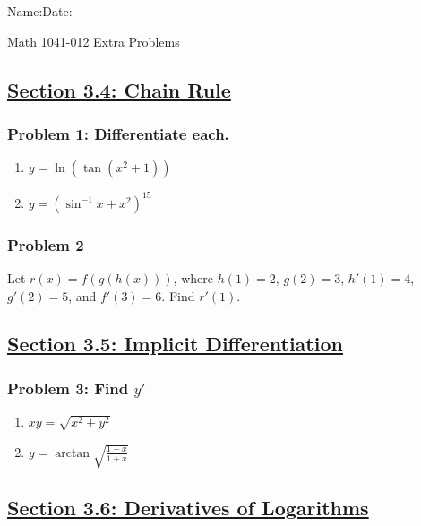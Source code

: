 \documentclass[10pt]{book}
\theoremstyle{definition}
\begin{document}
\begin{flushleft}
Name:\underline{\hspace{13cm}}Date:\underline{\hspace{2cm}}
\end{flushleft}
\begin{center}
{\Large Math 1041-012 \hspace{0.5cm} Extra  Problems}
\end{center}
\subsection*{\underline{Section 3.4: Chain Rule}}
\subsubsection*{Problem 1: Differentiate each.} 
\begin{enumerate}[label=(\alph*)]
    \item $y=\ln(\tan(x^2+1))$\vspace{2cm}
    \item $y=(\sin^{-1}x+x^2)^{15}$\vspace{2cm}
\end{enumerate}
\subsubsection*{Problem 2}
Let $r(x)=f(g(h(x)))$, where $h(1)=2$, $g(2)=3$, $h'(1)=4$, $g'(2)=5$, and $f'(3)=6$. Find $r'(1)$.\vspace{3cm}
\subsection*{\underline{Section 3.5: Implicit Differentiation}}
\subsubsection*{Problem 3: Find $y'$}
\begin{enumerate}[label=(\alph*)]
    \item $xy=\sqrt{x^2+y^2}$\vspace{3cm}
    \item $y=\arctan\sqrt{\frac{1-x}{1+x}}$\vspace{3cm}
\end{enumerate}
\clearpage
\subsection*{\underline{Section 3.6: Derivatives of Logarithms}}
\end{document}
